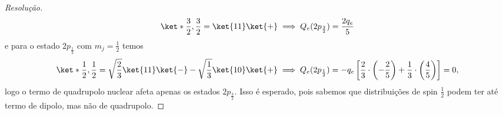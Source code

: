 \begin{proof}[Resolução]
   \begin{equation*}
      \ket*{\frac32, \frac32} = \ket{11}\ket{+} \implies Q_e(2p_{\frac32}) = \frac{2q_e}{5}
   \end{equation*}
   e para o estado \(2p_{\frac12}\) com \(m_j = \frac12\) temos
   \begin{equation*}
      \ket*{\frac12, \frac12} = \sqrt{\frac23}\ket{11}\ket{-} - \sqrt{\frac13} \ket{10}\ket{+} 
      \implies Q_e(2p_{\frac12}) = -q_e\left[ \frac23\cdot\left(-\frac25\right) + \frac13\cdot \left(\frac45\right) \right] = 0,
   \end{equation*}
   logo o termo de quadrupolo nuclear afeta apenas os estados \(2p_{\frac32}\). Isso é esperado, pois sabemos que distribuições de spin \(\frac12\) podem ter até termo de dipolo, mas não de quadrupolo.
\end{proof}
